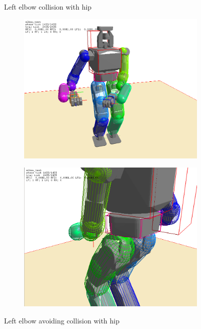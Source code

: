 \documentclass[letterpaper, 10 pt, conference]{ieeeconf}  %
\begin{document}
\begin{figure}[h]
\begin{center}
\begin{subfigure}[h]{0.45\columnwidth}
        \label{fig:eh4}
    \end{subfigure}
    \caption{Left elbow collision with hip}
    \label{fig:eh_col}
\end{center}
\end{figure}

\begin{figure}[h]
\begin{center}
    \begin{subfigure}[h]{0.45\columnwidth}
        \includegraphics[width=\columnwidth]{pictures/elbow_hip_1}
        \label{fig:eh1}
    \end{subfigure}
    \begin{subfigure}[h]{0.45\columnwidth}
        \includegraphics[width=\columnwidth]{pictures/elbow_hip_2}
        \label{fig:eh2}
    \end{subfigure}
    \caption{Left elbow avoiding collision with hip}
    \label{fig:eh_avoid}
\end{center}
\end{figure}
\end{document}

